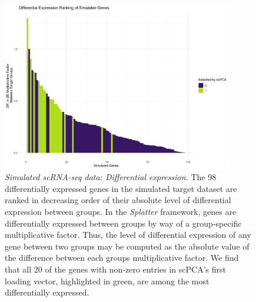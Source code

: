 \documentclass{article}
\begin{document}
\begin{figure}[!htbp]
    \centering
    \includegraphics[width=0.9\textwidth]{figures/sim_de_genes}
    \caption{{\em Simulated scRNA-seq data: Differential expression.}
    The 98 differentially expressed genes in the simulated target dataset are ranked in decreasing order of their absolute level of differential expression between groups. In the \textit{Splatter} framework, genes are differentially expressed between groups by way of a group-specific multiplicative factor. Thus, the level of differential expression of any gene between two groups may be computed as the absolute value of the difference between each groups multiplicative factor. We find that all 20 of the genes with non-zero entries in scPCA's first loading vector, highlighted in green, are among the most differentially expressed.}
    \label{fig:sim_de_genes}
\end{figure}
\end{document}
